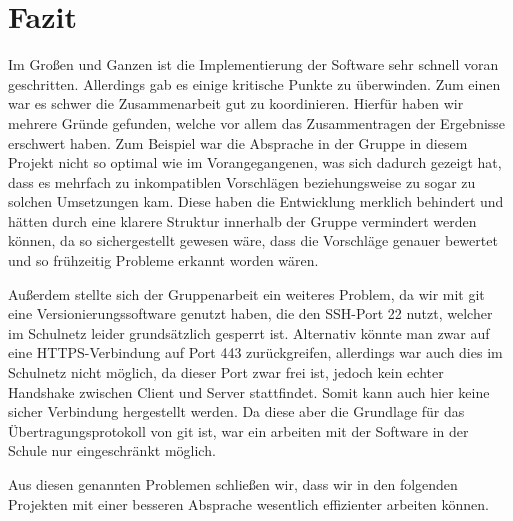 \documentclass[a4paper,11pt,abstracton,titlepage]{scrartcl}
\begin{document}
\section{Fazit}
Im Großen und Ganzen ist die Implementierung der Software sehr schnell voran
geschritten. Allerdings gab es einige kritische Punkte zu überwinden. Zum einen
war es schwer die Zusammenarbeit gut zu koordinieren. Hierfür haben wir mehrere
Gründe gefunden, welche vor allem das Zusammentragen der Ergebnisse erschwert
haben. Zum Beispiel war die Absprache in der Gruppe in diesem Projekt nicht so
optimal wie im Vorangegangenen, was sich dadurch gezeigt hat, dass es mehrfach
zu inkompatiblen Vorschlägen beziehungsweise zu sogar zu solchen Umsetzungen
kam. Diese haben die Entwicklung merklich behindert und hätten durch eine
klarere Struktur innerhalb der Gruppe vermindert werden können, da so
sichergestellt gewesen wäre, dass die Vorschläge genauer bewertet und so 
frühzeitig Probleme erkannt worden wären.

Außerdem stellte sich der Gruppenarbeit ein weiteres Problem, da wir mit git
eine Versionierungssoftware genutzt haben, die den SSH-Port 22 nutzt, welcher im
Schulnetz leider grundsätzlich gesperrt ist. Alternativ könnte man zwar auf eine
HTTPS-Verbindung auf Port 443 zurückgreifen, allerdings war auch dies im
Schulnetz nicht möglich, da dieser Port zwar frei ist, jedoch kein echter
Handshake zwischen Client und Server stattfindet. Somit kann auch hier keine
sicher Verbindung hergestellt werden. Da diese aber die Grundlage für das
Übertragungsprotokoll von git ist, war ein arbeiten mit der Software in der
Schule nur eingeschränkt möglich.

Aus diesen genannten Problemen schließen wir, dass wir in den folgenden
Projekten mit einer besseren Absprache wesentlich effizienter arbeiten können.
\end{document}
